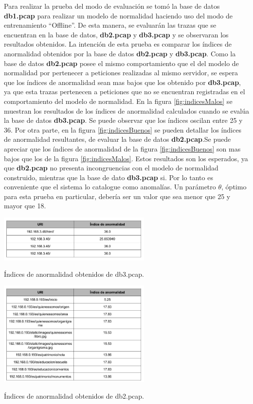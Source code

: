 Para realizar la prueba del modo de evaluación se tomó la base de datos
\textbf{db1.pcap} para realizar un modelo de normalidad haciendo uso del modo de entrenamiento ``Offline''. De esta manera, se evaluarán las trazas que se encuentran en la base de datos, \textbf{db2.pcap} y \textbf{db3.pcap} y se observaran los resultados obtenidos.
La intención de esta prueba es comparar los  índices de anormalidad
obtenidos por la base de datos \textbf{db2.pcap} y \textbf{db3.pcap}.
Como la base de datos \textbf{db2.pcap} posee el mismo comportamiento que
el del modelo de normalidad por pertenecer a peticiones realizadas al mismo servidor, se espera que los  índices de anormalidad sean mas bajos que los obtenido por \textbf{db3.pcap}, ya que esta trazas pertenecen a peticiones que no se encuentran registradas en el comportamiento del modelo de normalidad.
En la figura \ref{fig:indicesMalos} se muestran los resultados de los  índices de anormalidad calculados cuando se evalúa la base de datos \textbf{db3.pcap}.
Se puede observar que los índices oscilan entre 25 y 36.
Por otra parte, en la figura \ref{fig:indicesBuenos} se pueden detallar los índices de anormalidad resultantes, de evaluar la base de datos \textbf{db2.pcap}.Se puede apreciar que los índices de anormalidad de la figura \ref{fig:indicesBuenos} son mas bajos que los de la figura \ref{fig:indicesMalos}. Estos resultados son los esperados, ya que \textbf{db2.pcap} no presenta incongruencias con el modelo de normalidad construido, mientras que la base de dato \textbf{db3.pcap} si. Por lo tanto es conveniente que el sistema lo catalogue como anomalías.
Un parámetro $\theta$, óptimo para esta prueba en particular, debería ser un
valor que sea menor que 25 y mayor que 18.

\begin{table}[!htb]
\begin{center}
\includegraphics[width=3in]{./img/indicesMalos.png}
\caption{Índices de anormalidad obtenidos de db3.pcap.}
\label{fig:indicesMalos}
\end{center}
\end{table}

\begin{table}[!htb]
\begin{center}
\includegraphics[width=3in]{./img/indicesBuenos.jpg}
\caption{Índices de anormalidad obtenidos de db2.pcap.}
\label{fig:indicesBuenos}
\end{center}
\end{table}
